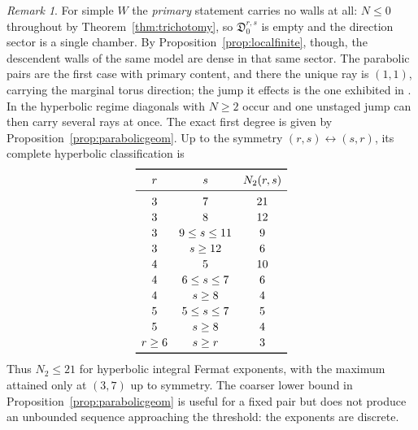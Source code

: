 \documentclass[11pt]{amsart}
\theoremstyle{definition}
\theoremstyle{remark}
\newtheorem{remark}[theorem]{Remark}
\newcommand{\Dscr}{\mathfrak{D}}
\begin{document}
\begin{remark}
\label{rem:thresholdgeom}
For simple $W$ the \emph{primary} statement carries no walls at all: $N\le0$
throughout by Theorem~\ref{thm:trichotomy}, so $\Dscr^{r,s}_{0}$ is empty and the direction sector is a
single chamber. By Proposition~\ref{prop:localfinite}, though, the descendent
walls of the same model are dense in that same sector. The parabolic pairs are the first
case with primary content, and there the unique
ray is $(1,1)$, carrying the marginal torus direction; the jump it effects is the
one exhibited in \cite[Ex.~4.9]{GKTsurvey}. In the hyperbolic regime diagonals
with $N\ge2$ occur and one unstaged jump can then carry several rays at once.
The exact first degree is given by Proposition~\ref{prop:parabolicgeom}.
Up to the symmetry $(r,s)\leftrightarrow(s,r)$, its complete hyperbolic
classification is
\[
\renewcommand{\arraystretch}{1.15}
\begin{array}{ccc}
\toprule
r&s&N_2(r,s)\\
\midrule
3&7&21\\
3&8&12\\
3&9\le s\le11&9\\
3&s\ge12&6\\
4&5&10\\
4&6\le s\le7&6\\
4&s\ge8&4\\
5&5\le s\le7&5\\
5&s\ge8&4\\
r\ge6&s\ge r&3\\
\bottomrule
\end{array}
\]
Thus $N_2\le21$ for hyperbolic integral Fermat exponents, with the maximum attained only
at $(3,7)$ up to symmetry. The coarser lower bound in
Proposition~\ref{prop:parabolicgeom} is useful for a fixed pair but does not
produce an unbounded sequence approaching the threshold: the exponents are
discrete.
\end{remark}
\end{document}
